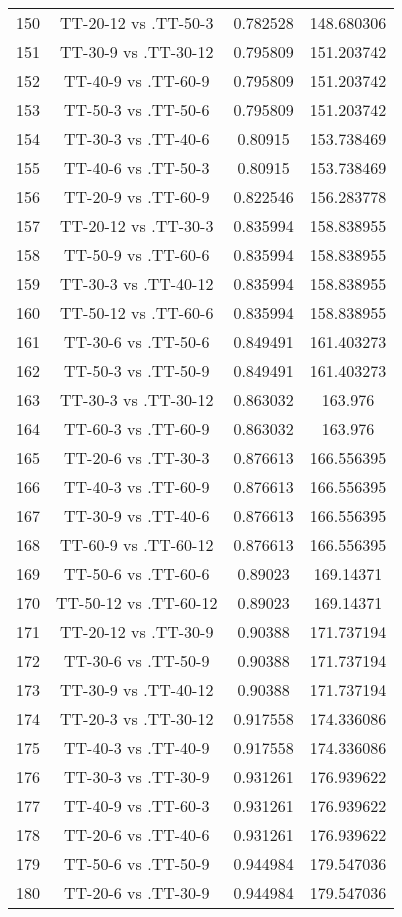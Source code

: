 \documentclass[a4paper,10pt]{article}
\begin{document}
\begin{landscape}
\begin{table}[!htp]
\begin{tabular}{cccc}
150&TT-20-12 vs .TT-50-3&0.782528&148.680306\\
151&TT-30-9 vs .TT-30-12&0.795809&151.203742\\
152&TT-40-9 vs .TT-60-9&0.795809&151.203742\\
153&TT-50-3 vs .TT-50-6&0.795809&151.203742\\
154&TT-30-3 vs .TT-40-6&0.80915&153.738469\\
155&TT-40-6 vs .TT-50-3&0.80915&153.738469\\
156&TT-20-9 vs .TT-60-9&0.822546&156.283778\\
157&TT-20-12 vs .TT-30-3&0.835994&158.838955\\
158&TT-50-9 vs .TT-60-6&0.835994&158.838955\\
159&TT-30-3 vs .TT-40-12&0.835994&158.838955\\
160&TT-50-12 vs .TT-60-6&0.835994&158.838955\\
161&TT-30-6 vs .TT-50-6&0.849491&161.403273\\
162&TT-50-3 vs .TT-50-9&0.849491&161.403273\\
163&TT-30-3 vs .TT-30-12&0.863032&163.976\\
164&TT-60-3 vs .TT-60-9&0.863032&163.976\\
165&TT-20-6 vs .TT-30-3&0.876613&166.556395\\
166&TT-40-3 vs .TT-60-9&0.876613&166.556395\\
167&TT-30-9 vs .TT-40-6&0.876613&166.556395\\
168&TT-60-9 vs .TT-60-12&0.876613&166.556395\\
169&TT-50-6 vs .TT-60-6&0.89023&169.14371\\
170&TT-50-12 vs .TT-60-12&0.89023&169.14371\\
171&TT-20-12 vs .TT-30-9&0.90388&171.737194\\
172&TT-30-6 vs .TT-50-9&0.90388&171.737194\\
173&TT-30-9 vs .TT-40-12&0.90388&171.737194\\
174&TT-20-3 vs .TT-30-12&0.917558&174.336086\\
175&TT-40-3 vs .TT-40-9&0.917558&174.336086\\
176&TT-30-3 vs .TT-30-9&0.931261&176.939622\\
177&TT-40-9 vs .TT-60-3&0.931261&176.939622\\
178&TT-20-6 vs .TT-40-6&0.931261&176.939622\\
179&TT-50-6 vs .TT-50-9&0.944984&179.547036\\
180&TT-20-6 vs .TT-30-9&0.944984&179.547036\\

\end{tabular}
\end{table}
\end{landscape}
\end{document}
